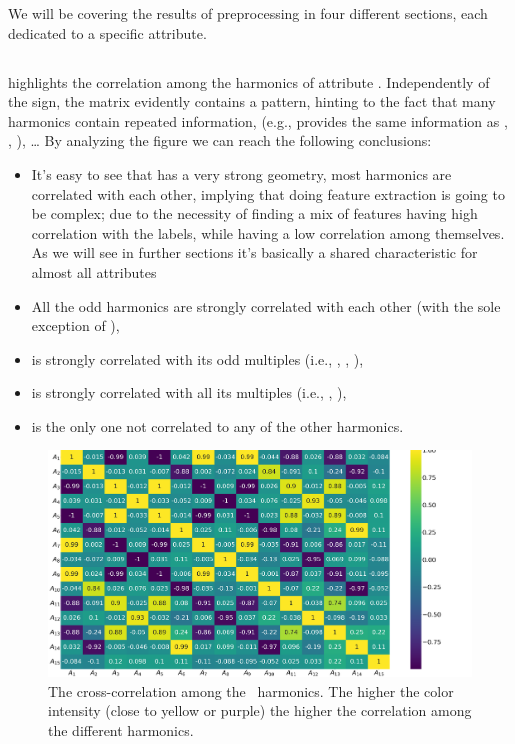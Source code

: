 We will be covering the results of preprocessing in four different sections, each dedicated to a
specific attribute.

\subsection{\an}
\label{sec:an}
 highlights the correlation among the harmonics of attribute \an. Independently of
the sign, the matrix evidently contains a pattern, hinting to the fact that many harmonics contain
repeated information, (e.g., \an[1] provides the same information as \an[3], \an[5], \an[7]), \ldots
By analyzing the figure we can reach the following conclusions:
\begin{itemize}
	\item It's easy to see that  has a very strong geometry, most harmonics
	      are correlated with each other, implying that doing feature extraction is going to
	      be complex; due to the necessity of finding a mix of features having high
	      correlation with the labels, while having a low correlation among
	      themselves. As we will see in further sections it's basically a shared characteristic for
	      almost all attributes
	\item All the odd harmonics are strongly correlated with each other (with the sole exception
	      of \an[15]),
	\item \an[2] is strongly correlated with its odd multiples (i.e., \an[6], \an[10], \an[14]),
	\item \an[4] is strongly correlated with all its multiples (i.e., \an[8], \an[12]),
	\item \an[15] is the only one not correlated to any of the other harmonics.
\end{itemize}
\begin{figure}[!ht]
	\centering
	\includegraphics[width=\linewidth]{img/An_corr_matrix.png}
	\caption{The cross-correlation among the \an\ harmonics. The higher the color intensity
		(close to yellow or purple) the higher the correlation among the different harmonics.} \label{fig:an-corr}
\end{figure}


